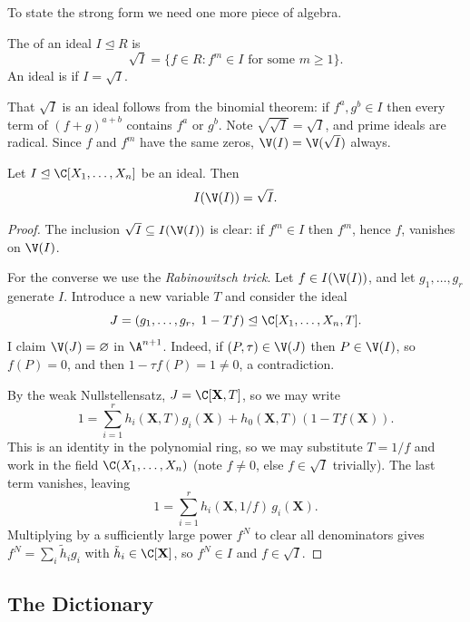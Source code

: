 To state the strong form we need one more piece of algebra.

\begin{definition}[Radical]
	The  of an ideal $I \trianglelefteq R$ is
	$$\sqrt{I} = \{f \in R : f^m \in I \text{ for some } m \geq 1\}.$$
	An ideal is  if $I = \sqrt{I}$.
\end{definition}

That $\sqrt I$ is an ideal follows from the binomial theorem: if $f^a, g^b \in I$ then every term of $(f+g)^{a+b}$ contains $f^a$ or $g^b$. Note $\sqrt{\sqrt I} = \sqrt I$, and prime ideals are radical. Since $f$ and $f^m$ have the same zeros, $\V(I) = \V(\sqrt I)$ always.

\begin{theorem}\label{thm:strongnss}
	Let $I \trianglelefteq \C[X_1,\dots,X_n]$ be an ideal. Then
	$$I(\V(I)) = \sqrt{I}.$$
\end{theorem}

\begin{proof}
	The inclusion $\sqrt I \subseteq I(\V(I))$ is clear: if $f^m \in I$ then $f^m$, hence $f$, vanishes on $\V(I)$.

	For the converse we use the \emph{Rabinowitsch trick}. Let $f \in I(\V(I))$, and let $g_1,\dots,g_r$ generate $I$. Introduce a new variable $T$ and consider the ideal
	$$J = (g_1,\dots,g_r,\ 1 - Tf) \trianglelefteq \C[X_1,\dots,X_n,T].$$
	I claim $\V(J) = \varnothing$ in $\A^{n+1}$. Indeed, if $(P,\tau) \in \V(J)$ then $P \in \V(I)$, so $f(P) = 0$, and then $1 - \tau f(P) = 1 \neq 0$, a contradiction.

	By the weak Nullstellensatz, $J = \C[\mathbf{X},T]$, so we may write
	$$1 = \sum_{i=1}^r h_i(\mathbf{X},T) g_i(\mathbf{X}) + h_0(\mathbf{X},T)(1 - Tf(\mathbf{X})).$$
	This is an identity in the polynomial ring, so we may substitute $T = 1/f$ and work in the field $\C(X_1,\dots,X_n)$ (note $f \neq 0$, else $f \in \sqrt I$ trivially). The last term vanishes, leaving
	$$1 = \sum_{i=1}^r h_i(\mathbf{X},1/f)\, g_i(\mathbf{X}).$$
	Multiplying by a sufficiently large power $f^N$ to clear all denominators gives $f^N = \sum_i \tilde{h}_i g_i$ with $\tilde h_i \in \C[\mathbf{X}]$, so $f^N \in I$ and $f \in \sqrt I$.
\end{proof}

\subsection{The Dictionary}

